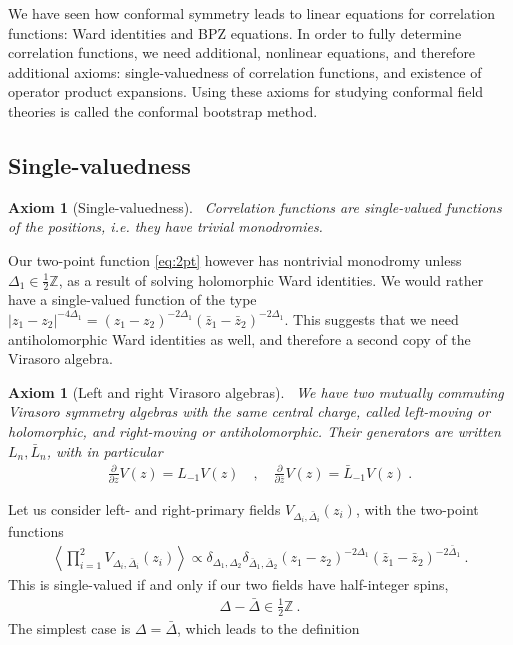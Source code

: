 \documentclass[12pt, a4paper]{article}
\theoremstyle{break}
\newtheorem{hyp}[exo]{Axiom}
\begin{document}
We have seen how conformal symmetry leads to linear equations for correlation functions: Ward identities and BPZ equations. 
In order to fully determine correlation functions, we need additional, nonlinear equations, and therefore additional axioms: single-valuedness of correlation functions, and existence of operator product expansions. 
Using these axioms for studying conformal field theories is called the conformal bootstrap method. 

\subsection{Single-valuedness}\label{sec:sv}

\begin{hyp}[Single-valuedness]
 ~\label{hyp:sv}
 Correlation functions are single-valued functions of the positions, i.e. they have trivial monodromies.
\end{hyp}
Our two-point function \eqref{eq:2pt} however has nontrivial monodromy unless $\Delta_1\in \frac12\mathbb{Z}$, as a  result of solving holomorphic Ward identities. 
We would rather have a single-valued function of the type $|z_1-z_2|^{-4\Delta_1} = (z_1-z_2)^{-2\Delta_1} (\bar z_1-\bar z_2)^{-2\Delta_1}$.
This suggests that we need antiholomorphic Ward identities as well, and therefore a second copy of the Virasoro algebra.

\begin{hyp}[Left and right Virasoro algebras]
 ~\label{hyp:lr}
 We have two mutually commuting Virasoro symmetry algebras with the same central charge, called left-moving or holomorphic, and right-moving or antiholomorphic. Their generators are written $L_n,\bar L_n$, with in particular
 \begin{align}
  \frac{\partial}{\partial z} V(z) = L_{-1}V(z)   \quad , \quad \frac{\partial}{\partial \bar z} V(z)= \bar L_{-1} V(z)   \ .
 \end{align}
\end{hyp}
Let us consider left- and right-primary fields $V_{\Delta_i,\bar\Delta_i}(z_i)$, with the 
two-point functions
\begin{align}
 \left<\prod_{i=1}^2 V_{\Delta_i,\bar\Delta_i}(z_i) \right> \propto \delta_{\Delta_1,\Delta_2}\delta_{\bar\Delta_1,\bar\Delta_2} (z_1-z_2)^{-2\Delta_1} (\bar z_1-\bar z_2)^{-2\bar\Delta_1}\ .
\end{align}
This is single-valued if and only if our two fields have half-integer spins,
\begin{align}
 \Delta -\bar \Delta \in \frac12\mathbb{Z}\ .
\end{align} 
The simplest case is $\Delta=\bar\Delta$, which leads to the definition
\end{document}
